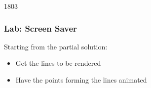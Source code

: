 
\begin{slide}{1803}\frametitle{Lab: Screen Saver}

Starting from the partial solution:

\begin{itemize}
\item Get the lines to be rendered
\item Have the points forming the lines animated
\end{itemize}

\end{slide}

